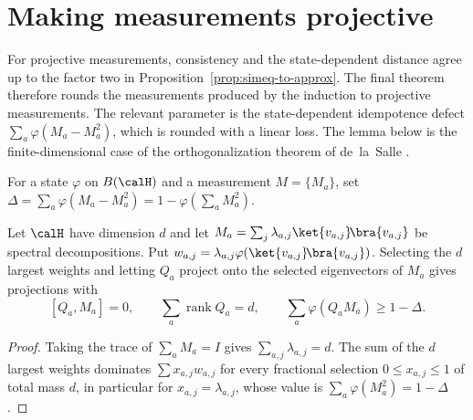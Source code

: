 \chapter{Making measurements projective}
\label{chap:projective}
\label{sec:making-measurements-projective}

For projective measurements, consistency and the state-dependent distance agree
up to the factor two in Proposition~\ref{prop:simeq-to-approx}.  The final
theorem therefore rounds the measurements produced by the induction to
projective measurements.  The relevant parameter is the state-dependent
idempotence defect $\sum_a\varphi(M_a-M_a^2)$, which is rounded with a linear
loss.  The lemma below is the finite-dimensional case of the orthogonalization
theorem of de~la~Salle \cite{deLaSalle2022Orthogonalization}.

\begin{definition}\label{def:idempotence-defect}
	\leanok
	For a state $\varphi$ on $B(\calH)$ and a measurement $M=\{M_a\}$, set
	$\Delta=\sum_a\varphi(M_a-M_a^2)=1-\varphi(\sum_aM_a^2)$.
\end{definition}

\begin{lemma}\label{lem:global-rank-allocation}
	\leanok
	Let $\calH$ have dimension $d$ and let $M_a=\sum_j\lambda_{a,j}\ket{v_{a,j}}\!\bra{v_{a,j}}$
	be spectral decompositions.  Put $w_{a,j}=\lambda_{a,j}\varphi(\ket{v_{a,j}}\!\bra{v_{a,j}})$.
	Selecting the $d$ largest weights and letting $Q_a$ project onto the
	selected eigenvectors of $M_a$ gives projections with
	\[
		[Q_a,M_a]=0,\qquad\sum_a\operatorname{rank}Q_a=d,\qquad
		\sum_a\varphi(Q_aM_a)\ge1-\Delta.
	\]
\end{lemma}
\begin{proof}
	\leanok
	Taking the trace of $\sum_aM_a=I$ gives $\sum_{a,j}\lambda_{a,j}=d$.  The
	sum of the $d$ largest weights dominates $\sum x_{a,j}w_{a,j}$ for every
	fractional selection $0\le x_{a,j}\le1$ of total mass $d$, in particular
	for $x_{a,j}=\lambda_{a,j}$, whose value is
	$\sum_a\varphi(M_a^2)=1-\Delta$.
\end{proof}

